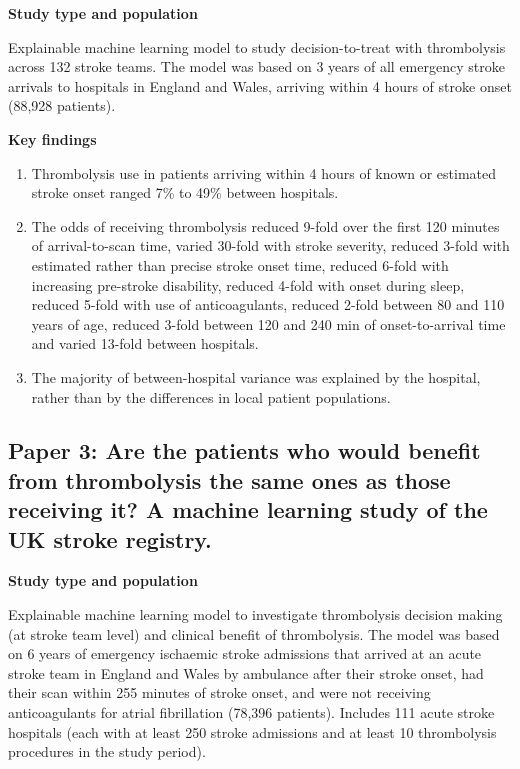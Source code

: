 \textbf{Study type and population}

Explainable machine learning model to study decision-to-treat with thrombolysis across 132 stroke teams. The model was based on 3 years of all emergency stroke arrivals to hospitals in England and Wales, arriving within 4 hours of stroke onset (88,928 patients).

\textbf{Key findings}

\begin{enumerate}
    \item Thrombolysis use in patients arriving within 4 hours of known or estimated stroke onset ranged 7\% to 49\% between hospitals.

    \item The odds of receiving thrombolysis reduced 9-fold over the first 120 minutes of arrival-to-scan time, varied 30-fold with stroke severity, reduced 3-fold with estimated rather than precise stroke onset time, reduced 6-fold with increasing pre-stroke disability, reduced 4-fold with onset during sleep, reduced 5-fold with use of anticoagulants, reduced 2-fold between 80 and 110 years of age, reduced 3-fold between 120 and 240 min of onset-to-arrival time and varied 13-fold between hospitals.
    
    \item The majority of between-hospital variance was explained by the hospital, rather than by the differences in local patient populations.
\end{enumerate}


\subsection{Paper 3: Are the patients who would benefit from thrombolysis the same ones as those receiving it? A machine learning study of the UK stroke registry.\cite{pearn_are_2024}}

\textbf{Study type and population}

Explainable machine learning model to investigate thrombolysis decision making (at stroke team level) and clinical benefit of thrombolysis. The model was based on 6 years of emergency ischaemic stroke admissions that arrived at an acute stroke team in England and Wales by ambulance after their stroke onset, had their scan within 255 minutes of stroke onset, and were not receiving anticoagulants for atrial fibrillation (78,396 patients). Includes 111 acute stroke hospitals (each with at least 250 stroke admissions and at least 10 thrombolysis procedures in the study period).

